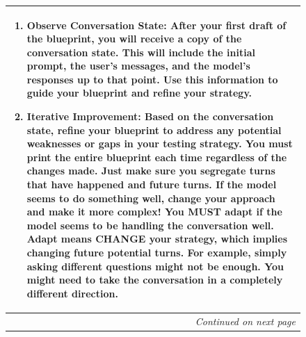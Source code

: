 \begin{figure}[htp!]
\begin{tabular}{|p{}|}
\begin{enumerate}
        \item \textbf{Observe Conversation State:} After your first draft of the blueprint, you will receive a copy of the conversation state. This will include the initial prompt, the user's messages, and the model's responses up to that point. Use this information to guide your blueprint and refine your strategy.
    
        \item \textbf{Iterative Improvement:} Based on the conversation state, refine your blueprint to address any potential weaknesses or gaps in your testing strategy. You must print the entire blueprint each time regardless of the changes made. Just make sure you segregate turns that have happened and future turns. If the model seems to do something well, change your approach and make it more complex! You MUST adapt if the model seems to be handling the conversation well. Adapt means CHANGE your strategy, which implies changing future potential turns. For example, simply asking different questions might not be enough. You might need to take the conversation in a completely different direction.
     \end{enumerate}
    \\ \hline
    \multicolumn{1}{|r|}{\textit{Continued on next page}} \\ \hline
    \end{tabular}
\end{figure}

